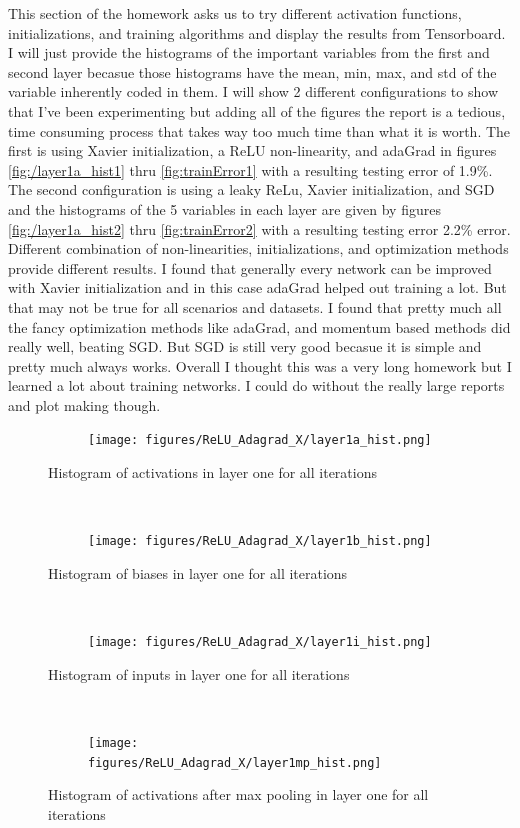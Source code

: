 \documentclass[]{article}
\begin{document}
This section of the homework asks us to try different activation functions, initializations, and training algorithms and display the results from Tensorboard. I will just provide the histograms of the important variables from the first and second layer becasue those histograms have the mean, min, max, and std of the variable inherently coded in them. I will show 2 different configurations to show that I've been experimenting but adding all of the figures the report is a tedious, time consuming process that takes way too much time than what it is worth. The first is using Xavier initialization, a ReLU non-linearity, and adaGrad in figures \ref{fig:/layer1a_hist1} thru \ref{fig:trainError1} with a resulting testing error of 1.9\%. The second configuration is using a leaky ReLu, Xavier initialization, and SGD and the histograms of the 5 variables in each layer are given by figures  \ref{fig:/layer1a_hist2} thru \ref{fig:trainError2} with a resulting testing error 2.2\% error. Different combination of non-linearities, initializations, and optimization methods provide different results. I found that generally every network can be improved with Xavier initialization and in this case adaGrad helped out training a lot. But that may not be true for all scenarios and datasets. I found that pretty much all the fancy optimization methods like adaGrad, and momentum based methods did really well, beating SGD. But SGD is still very good becasue it is simple and pretty much always works. Overall I thought this was a very long homework but I learned a lot about training networks. I could do without the really large reports and plot making though. 

\begin{figure}[ht]
    \centering
    \begin{subfigure}
        \centering
        \texttt{[image: figures/ReLU\_Adagrad\_X/layer1a\_hist.png]}
    \end{subfigure}%
    \caption{Histogram of activations in layer one for all iterations}
 \label{fig:/layer1a_hist1}
    ~ 
    \centering
    \begin{subfigure}
        \centering
        \texttt{[image: figures/ReLU\_Adagrad\_X/layer1b\_hist.png]}
    \end{subfigure}%
    \caption{Histogram of biases in  layer one for all iterations}
 \label{fig:/layer1b_hist1}
    ~ 
    \centering
    \begin{subfigure}
        \centering
        \texttt{[image: figures/ReLU\_Adagrad\_X/layer1i\_hist.png]}
    \end{subfigure}%
    \caption{Histogram of  inputs in  layer one for all iterations}
 \label{fig:/layer1i_hist1}
    ~ 
    \centering
    \begin{subfigure}
        \centering
        \texttt{[image: figures/ReLU\_Adagrad\_X/layer1mp\_hist.png]}
    \end{subfigure}%
    \caption{Histogram of activations after max pooling in  layer one for all iterations}
 \label{fig:/layer1mp_hist1}
\end{figure}
\end{document}
